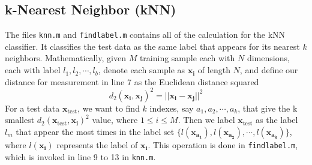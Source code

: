 \documentclass{article}
\begin{document}
     \subsection{k-Nearest Neighbor (kNN)}  
     The files \texttt{knn.m} and \texttt{findlabel.m} contains all of the calculation for the kNN classifier. It classifies the test data as the same label that appears for its nearest $k$ neighbors. Mathematically, given $M$ training sample each with $N$ dimensions, each with label $l_1, l_2, \cdots, l_b$, denote each sample as $\mathbf{x_i}$ of length $N$, and define our distance for measurement in line 7 as the Euclidean distance squared
      \begin{equation}
     d_2(\mathbf{x_i},\mathbf{x_j})^2 = ||\mathbf{x_i}-\mathbf{x_j}||^2
     \end{equation}
      For a test data $\mathbf{x}_\text{test}$, we want to find $k$ indexes, say $a_1, a_2, \cdots , a_k$, that give the k smallest $d_2(\mathbf{x}_\text{test},\mathbf{x_i})^2$ value, where $1\leq i\leq M$. Then we label $\mathbf{x}_\text{test}$ as the label $l_m$ that appear the most times in the label set $\{l(\mathbf{x_{a_1}}), l(\mathbf{x_{a_2}}),\cdots, l(\mathbf{x_{a_k}})\}$, where $l(\mathbf{x_i})$ represents the label of $\mathbf{x_i}$. This operation is done in \texttt{findlabel.m}, which is invoked in line 9 to 13 in \texttt{knn.m}. \\
      
\end{document}
